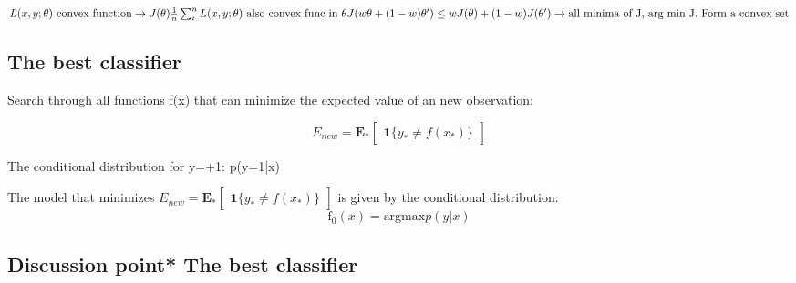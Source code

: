 $
L(x,y;\theta) \text{ convex function} \rightarrow J(\theta) \frac{1} {n} \sum_{i}^{n} L(x,y;\theta) \\ \text{ also convex func in }\theta
J(w\theta+(1-w)\theta^{\prime}) \le wJ(\theta) + (1-w) J(\theta^{\prime}) \\ \rightarrow \text{all minima of J, arg min J. Form a convex set}$

\subsection*{The best classifier}
Search through all functions f(x) that can minimize the expected value of an new observation:

\begin{equation}
E_{new} = \textbf{E}_* \begin{bmatrix} \textbf{1} \{ y_* \neq f(x_*)\} \end{bmatrix}
\end{equation}


The conditional distribution for y=+1: p(y=1|x)

The model that minimizes $E_{new} = \textbf{E}_* \begin{bmatrix} \textbf{1} \{ y_* \neq f(x_*)\} \end{bmatrix}$ is given by the conditional distribution:
\begin{equation}
\text{f}_0(x) = \text{argmax} p(y|x)
\end{equation}


\subsection*{Discussion point* The best classifier}

